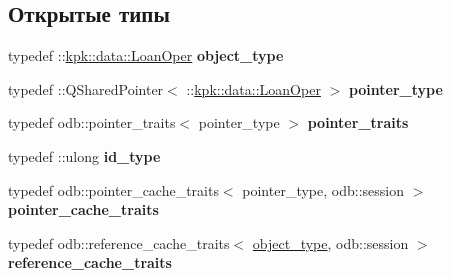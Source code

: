 \subsection*{Открытые типы}
\begin{DoxyCompactItemize}
\item 
typedef \+::\hyperlink{classkpk_1_1data_1_1_loan_oper}{kpk\+::data\+::\+Loan\+Oper} {\bfseries object\+\_\+type}\hypertarget{classodb_1_1access_1_1object__traits_3_01_1_1kpk_1_1data_1_1_loan_oper_01_4_a9504baeee90494a454cb718af66d2fff}{}\label{classodb_1_1access_1_1object__traits_3_01_1_1kpk_1_1data_1_1_loan_oper_01_4_a9504baeee90494a454cb718af66d2fff}

\item 
typedef \+::Q\+Shared\+Pointer$<$ \+::\hyperlink{classkpk_1_1data_1_1_loan_oper}{kpk\+::data\+::\+Loan\+Oper} $>$ {\bfseries pointer\+\_\+type}\hypertarget{classodb_1_1access_1_1object__traits_3_01_1_1kpk_1_1data_1_1_loan_oper_01_4_a6335e42e3817029e027da1f49d3c50ab}{}\label{classodb_1_1access_1_1object__traits_3_01_1_1kpk_1_1data_1_1_loan_oper_01_4_a6335e42e3817029e027da1f49d3c50ab}

\item 
typedef odb\+::pointer\+\_\+traits$<$ pointer\+\_\+type $>$ {\bfseries pointer\+\_\+traits}\hypertarget{classodb_1_1access_1_1object__traits_3_01_1_1kpk_1_1data_1_1_loan_oper_01_4_a803386e17ea165025f50be9164d31e6a}{}\label{classodb_1_1access_1_1object__traits_3_01_1_1kpk_1_1data_1_1_loan_oper_01_4_a803386e17ea165025f50be9164d31e6a}

\item 
typedef \+::ulong {\bfseries id\+\_\+type}\hypertarget{classodb_1_1access_1_1object__traits_3_01_1_1kpk_1_1data_1_1_loan_oper_01_4_a2bd7137dc72ab41e276f6abcfa7c5751}{}\label{classodb_1_1access_1_1object__traits_3_01_1_1kpk_1_1data_1_1_loan_oper_01_4_a2bd7137dc72ab41e276f6abcfa7c5751}

\item 
typedef odb\+::pointer\+\_\+cache\+\_\+traits$<$ pointer\+\_\+type, odb\+::session $>$ {\bfseries pointer\+\_\+cache\+\_\+traits}\hypertarget{classodb_1_1access_1_1object__traits_3_01_1_1kpk_1_1data_1_1_loan_oper_01_4_aefd667a84a27a1dc1cefd1e4838f2eac}{}\label{classodb_1_1access_1_1object__traits_3_01_1_1kpk_1_1data_1_1_loan_oper_01_4_aefd667a84a27a1dc1cefd1e4838f2eac}

\item 
typedef odb\+::reference\+\_\+cache\+\_\+traits$<$ \hyperlink{classkpk_1_1data_1_1_loan_oper}{object\+\_\+type}, odb\+::session $>$ {\bfseries reference\+\_\+cache\+\_\+traits}\hypertarget{classodb_1_1access_1_1object__traits_3_01_1_1kpk_1_1data_1_1_loan_oper_01_4_a2d1c4aa30641117c661b2c4a07559d83}{}\label{classodb_1_1access_1_1object__traits_3_01_1_1kpk_1_1data_1_1_loan_oper_01_4_a2d1c4aa30641117c661b2c4a07559d83}

\end{DoxyCompactItemize}
